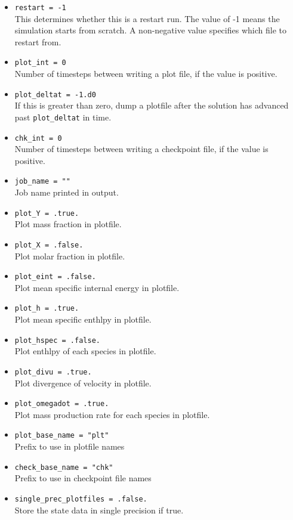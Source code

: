 \documentclass[11pt,letterpaper]{article}
\begin{document}
\begin{itemize}
\item {\tt restart = -1}\\
  This determines whether this is a restart run.  The value of -1
  means the simulation starts from scratch.  A non-negative value
  specifies which file to restart from.
\item {\tt plot\_int = 0}\\
  Number of timesteps between writing a plot file, if the value is
  positive.
\item {\tt plot\_deltat = -1.d0} \\
  If this is greater than zero, dump a plotfile after the solution has
  advanced past {\tt plot\_deltat} in time.
\item {\tt chk\_int = 0}\\
  Number of timesteps between writing a checkpoint file, if the value is
  positive.
\item {\tt job\_name = ""}\\
  Job name printed in output.
\item {\tt plot\_Y = .true.}\\
  Plot mass fraction in plotfile.
\item {\tt plot\_X = .false.}\\
  Plot molar fraction in plotfile.
\item {\tt plot\_eint = .false.}\\
  Plot mean specific internal energy in plotfile.
\item {\tt plot\_h = .true.}\\
  Plot mean specific enthlpy in plotfile.
\item {\tt plot\_hspec = .false.}\\
  Plot enthlpy of each species in plotfile.
\item {\tt plot\_divu = .true.}\\
  Plot divergence of velocity in plotfile.
\item {\tt plot\_omegadot = .true.}\\
  Plot mass production rate for each species in plotfile.
\item {\tt plot\_base\_name = "plt"}\\
  Prefix to use in plotfile names
\item {\tt check\_base\_name = "chk"}\\
  Prefix to use in checkpoint file names
\item {\tt single\_prec\_plotfiles = .false.}\\
  Store the state data in single precision if true.
\end{itemize}
\end{document}
